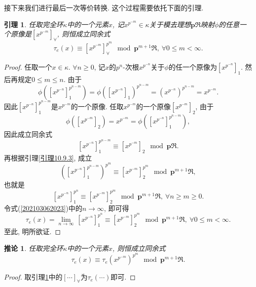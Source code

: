\documentclass[UTF8, twoside]{ctexart}
\theoremstyle{nonumberplain}
\newtheorem{proof}{\heiti 证明}  %
\theoremstyle{nonumberplain}
\theoremstyle{plain}
\newtheorem{yinli4}[dingyi4]{引理}
\newtheorem{tuilun4}[dingyi4]{推论}
\begin{document}
	\quad
	接下来我们进行最后一次等价转换. 这个过程需要依托下面的引理.
	\begin{yinli4} \label{202103062028}
		任取完全环$\kappa $中的一个元素$x$, 记${{x}^{{{p}^{-m}}}}\in \kappa $关于模去理想$\bm{p}\Re $映射$\phi $的任意一个原像是$\left[ {{x}^{{{p}^{-m}}}} \right]_{\forall}$, 则恒成立同余式
		\[
			{{\tau }_{e}}\left( x \right)\equiv 
			\left[ {{x}^{{{p}^{-m}}}} \right]_{\forall }^{{{p}^{m}}}
			\ \bmod {\bm{p}^{m+1}}\Re,\ 
			\forall 0 \le m < \infty.
		\]
	\end{yinli4}
	\begin{proof}
		任取一个$x\in \kappa $. $\forall n\ge 0$, 记$x$的${{p}^{n}}$-次根${{x}^{{{p}^{-n}}}}$关于$\phi $的任一个原像为${{\left[ {{x}^{{{p}^{-n}}}} \right]}_{1}}$. 然后再规定$0\le m\le n$. 由于
		\[
			\phi \left( \left[ {{x}^{{{p}^{-n}}}} \right]_{1}^{{{p}^{n-m}}} \right)=\phi {{\left( {{\left[ {{x}^{{{p}^{-n}}}} \right]}_{1}} \right)}^{{{p}^{n-m}}}}={{\left( {{x}^{{{p}^{-n}}}} \right)}^{{{p}^{n-m}}}}={{x}^{{{p}^{-m}}}}.
		\]
		因此$\left[ {{x}^{{{p}^{-n}}}} \right]_{1}^{{{p}^{n-m}}}$是${{x}^{{{p}^{-m}}}}$的一个原像. 任取${{x}^{{{p}^{-m}}}}$的一个原像${{\left[ {{x}^{{{p}^{-m}}}} \right]}_{2}}$, 由于
		\[
			\phi \left( {{\left[ {{x}^{{{p}^{-m}}}} \right]}_{2}} \right)={{x}^{{{p}^{-m}}}}=\phi \left( \left[ {{x}^{{{p}^{-n}}}} \right]_{1}^{{{p}^{n-m}}} \right),
		\]
		因此成立同余式
		\[
			\left[ {{x}^{{{p}^{-n}}}} \right]_{1}^{{{p}^{n-m}}}\equiv {{\left[ {{x}^{{{p}^{-m}}}} \right]}_{2}}
			\ \bmod \bm{p}\Re .
		\]
		再根据引理\ref{引理10.9.3}, 成立
		\[
			{{\left( \left[ {{x}^{{{p}^{-n}}}} \right]_{1}^{{{p}^{n-m}}} \right)}^{{{p}^{m}}}}\equiv \left[ {{x}^{{{p}^{-m}}}} \right]_{2}^{{{p}^{m}}}
			\ \bmod {\bm{p}^{m+1}}\Re ,
		\]
		也就是
		\begin{equation} \label{202103062023}
			\left[ {{x}^{{{p}^{-n}}}} \right]_{1}^{{{p}^{n}}}\equiv \left[ {{x}^{{{p}^{-m}}}} \right]_{2}^{{{p}^{m}}}
			\ \bmod {\bm{p}^{m+1}}\Re ,
			\ \forall n\ge m\ge 0.
		\end{equation}
		令式(\ref{202103062023})中的$n\to \infty $, 即可得
		\[
			{{\tau }_{e}}\left( x \right)=\underset{n\to \infty }{\mathop{\lim }}\,\left[ {{x}^{{{p}^{-n}}}} \right]_{1}^{{{p}^{n}}}\equiv \left[ {{x}^{{{p}^{-m}}}} \right]_{2}^{{{p}^{m}}}\ \bmod {\bm{p}^{m+1}}\Re ,\ \forall 0\le m<\infty .
		\]
		至此, 明所欲证.
	\end{proof}
	\begin{tuilun4} \label{202103062031}
		任取完全环$\kappa $中的一个元素$x$, 则恒成立同余式
		\[
			{{\tau }_{e}}\left( x \right)\equiv {{\tau }_{e}}{{\left( {{x}^{{{p}^{-m}}}} \right)}^{{{p}^{m}}}}\ \bmod {\bm{p}^{m+1}}\Re .
		\]
	\end{tuilun4}
	\begin{proof}
		取引理\ref{202103062028}中的${{\left[ \cdots  \right]}_{\forall }}$为${{\tau }_{e}}\left( \cdots  \right)$即可.
	\end{proof}
	\vskip 0.5cm
	
\end{document}
